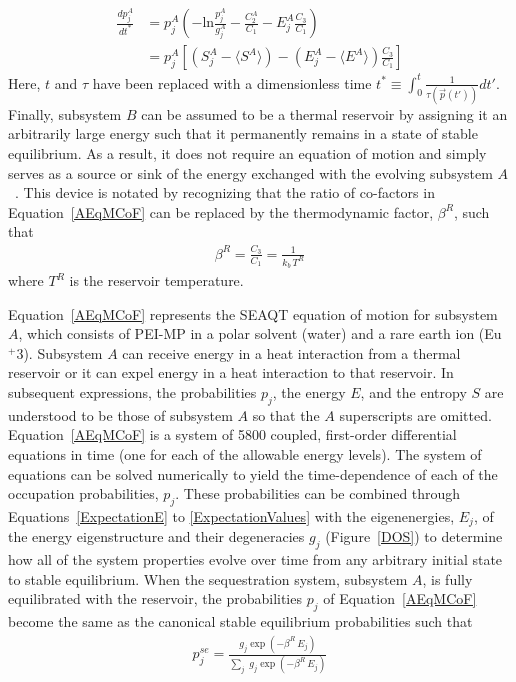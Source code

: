 \documentclass[
journal=jcisd8, %
manuscript=article,
layout=twocolumn   %
]{achemso}
\begin{document}
\begin{align}
\frac {dp_j^A}{dt^*} & = p_j^A \left(-\text{ln}\frac{p_j^A}{g_j^A}-\frac{C_2^A}{C_1}-{E}_j^A\frac{C_3}{C_1}\right) \nonumber \\
&   = p_j^A \left[(S_j^A - \langle S^A \rangle)-({E}_j^A - \langle {E}^A\rangle)\frac{C_3}{C_1}\right] %
\label{AEqMCoF}
\end{align}
Here, $t$ and $\tau$ have been replaced with a dimensionless time $t^* \equiv \int_0^t \frac{1}{\tau(\vec{p}(t'))}dt'$. Finally, subsystem $B$ can be assumed to be a thermal reservoir by assigning it an arbitrarily large energy such that it permanently remains in a state of stable equilibrium. As a result, it does not require an equation of motion and simply serves as a source or sink of the energy exchanged with the evolving subsystem $A$~\cite{Li2016a, Li2018}. This device is notated by recognizing that the ratio of co-factors in Equation~\ref{AEqMCoF} can be replaced by the thermodynamic factor, $\beta^R$, such that
\begin{align}
\beta^R = \frac{C_3}{C_1}= \frac{1}{k_b \, T^R}
\end{align}
where $T^R$ is the reservoir temperature.  

Equation~\ref{AEqMCoF} represents the SEAQT equation of motion for subsystem $A$, which consists of PEI-MP in a polar solvent (water) and a rare earth ion (Eu$^+3$). Subsystem $A$ can receive energy in a heat interaction from a thermal reservoir or it can expel energy in a heat interaction to that reservoir. In subsequent expressions, the  probabilities $p_j$, the energy $E$, and the entropy $S$ are understood to be those of subsystem $A$ so that the $A$ superscripts are omitted. Equation~\ref{AEqMCoF} is a system of 5800 coupled, first-order differential equations in time (one for each of the allowable energy levels). The system of equations can be solved numerically to yield the time-dependence of each of the occupation probabilities, $p_j$. These probabilities  can be combined through Equations~\ref{ExpectationE} to \ref{ExpectationValues}  with the eigenenergies, $E_j$, of the energy eigenstructure and their degeneracies $g_j$ (Figure~\ref{DOS}) to determine how all of the system properties evolve over time from any arbitrary initial state to stable equilibrium.  When the sequestration system, subsystem $A$, is fully equilibrated with the reservoir, the probabilities $p_j$ of Equation~\ref{AEqMCoF} become the same as the canonical stable equilibrium probabilities such that
\begin{align}
p_j^{{se}}=\frac {g_j \exp(-\beta^R \, E_j)}{\underset {j} {{\sum}}\phantom{l}g_j \exp(-\beta^R \, E_j)}
\label{CanDist}
\end{align}
\end{document}
